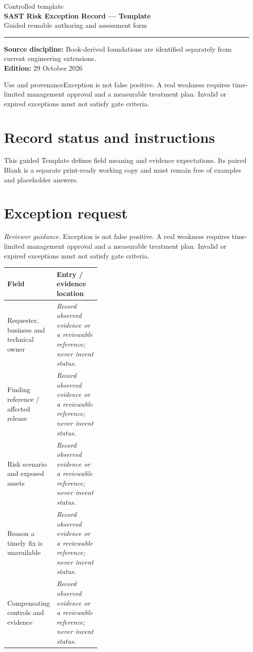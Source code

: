 \documentclass[10pt,letterpaper]{article}
\begin{document}
\hypersetup{pageanchor=false}%
\begin{titlepage}
\vspace*{1.0in}
{\color{bluegray}\Large Controlled template}\\[1.0em]
{\color{navy}\Huge\bfseries SAST Risk Exception Record --- Template}\\[0.7em]
{\Large Guided reusable authoring and assessment form}\\[2.0em]
\rule{\linewidth}{1.0pt}
\vfill
\textbf{Source discipline:} Book-derived foundations are identified separately from current engineering extensions.\\
\textbf{Edition:} 29 October 2026
\end{titlepage}\hypersetup{pageanchor=true}
\tableofcontents
\clearpage
\begin{focusbox}{Use and provenance}Exception is not false positive. A real weakness requires time-limited management approval and a measurable treatment plan. Invalid or expired exceptions must not satisfy gate criteria.\end{focusbox}
\section{Record status and instructions}
This guided Template defines field meaning and evidence expectations. Its paired Blank is a separate print-ready working copy and must remain free of examples and placeholder answers.

\section{Exception request}
\textit{Reviewer guidance.} Exception is not false positive. A real weakness requires time-limited management approval and a measurable treatment plan. Invalid or expired exceptions must not satisfy gate criteria.
\begin{tabularx}{\linewidth}{@{}p{0.38\linewidth}Y@{}}
\toprule Field & Entry / evidence location\\\midrule
Requester, business and technical owner & \textit{Record observed evidence or a reviewable reference; never invent status.}\\[1.0em]
\midrule
Finding reference / affected release & \textit{Record observed evidence or a reviewable reference; never invent status.}\\[1.0em]
\midrule
Risk scenario and exposed assets & \textit{Record observed evidence or a reviewable reference; never invent status.}\\[1.0em]
\midrule
Reason a timely fix is unavailable & \textit{Record observed evidence or a reviewable reference; never invent status.}\\[1.0em]
\midrule
Compensating controls and evidence & \textit{Record observed evidence or a reviewable reference; never invent status.}\\[1.0em]
\midrule
\end{tabularx}
\end{document}
